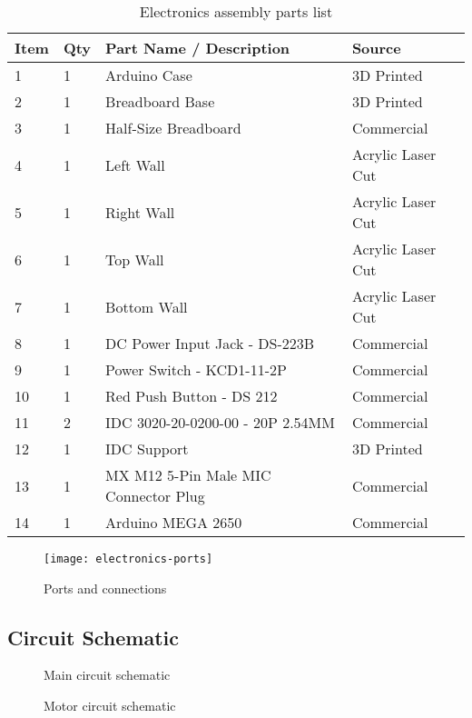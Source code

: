 \begin{table}[]
    \centering
    \caption{Electronics assembly parts list}
    \label{tab:electronics-assembly}
    \begin{tabular}{llll}
    \toprule
    Item & Qty & Part Name / Description & Source \\
    \midrule
    1 & 1 & Arduino Case & 3D Printed \\
    2 & 1 & Breadboard Base & 3D Printed \\
    3 & 1 & Half-Size Breadboard & Commercial \\
    4 & 1 & Left Wall & Acrylic Laser Cut \\
    5 & 1 & Right Wall & Acrylic Laser Cut \\
    6 & 1 & Top Wall & Acrylic Laser Cut \\
    7 & 1 & Bottom Wall & Acrylic Laser Cut \\
    8 & 1 & DC Power Input Jack - DS-223B & Commercial \\
    9 & 1 & Power Switch - KCD1-11-2P & Commercial \\
    10 & 1 & Red Push Button - DS 212 & Commercial \\
    11 & 2 & IDC 3020-20-0200-00 - 20P 2.54MM & Commercial \\
    12 & 1 & IDC Support & 3D Printed \\
    13 & 1 & MX M12 5-Pin Male MIC Connector Plug & Commercial \\
    14 & 1 & Arduino MEGA 2650 & Commercial \\
    \bottomrule
    \end{tabular}
\end{table}



\begin{figure}
    \centering
    \texttt{[image: electronics-ports]}
    \caption{Ports and connections}
    \label{fig:electronics-ports}
\end{figure}

\subsection{Circuit Schematic}

\begin{figure}
    \centering
    
    \caption{Main circuit schematic}
    \label{fig:main-circuit-assembly}
\end{figure}

\begin{figure}
    \centering
    
    \caption{Motor circuit schematic}
    \label{fig:motor-circuit-assembly}
\end{figure}

